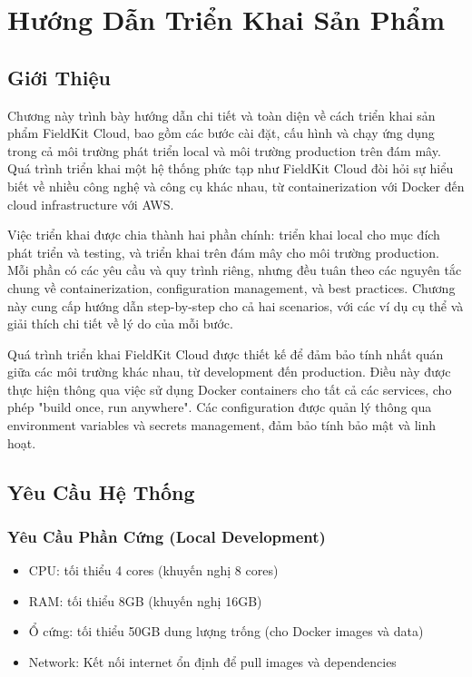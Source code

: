 \section{Hướng Dẫn Triển Khai Sản Phẩm}

\subsection{Giới Thiệu}

Chương này trình bày hướng dẫn chi tiết và toàn diện về cách triển khai sản phẩm FieldKit Cloud, bao gồm các bước cài đặt, cấu hình và chạy ứng dụng trong cả môi trường phát triển local và môi trường production trên đám mây. Quá trình triển khai một hệ thống phức tạp như FieldKit Cloud đòi hỏi sự hiểu biết về nhiều công nghệ và công cụ khác nhau, từ containerization với Docker đến cloud infrastructure với AWS.

Việc triển khai được chia thành hai phần chính: triển khai local cho mục đích phát triển và testing, và triển khai trên đám mây cho môi trường production. Mỗi phần có các yêu cầu và quy trình riêng, nhưng đều tuân theo các nguyên tắc chung về containerization, configuration management, và best practices. Chương này cung cấp hướng dẫn step-by-step cho cả hai scenarios, với các ví dụ cụ thể và giải thích chi tiết về lý do của mỗi bước.

Quá trình triển khai FieldKit Cloud được thiết kế để đảm bảo tính nhất quán giữa các môi trường khác nhau, từ development đến production. Điều này được thực hiện thông qua việc sử dụng Docker containers cho tất cả các services, cho phép "build once, run anywhere". Các configuration được quản lý thông qua environment variables và secrets management, đảm bảo tính bảo mật và linh hoạt.

\subsection{Yêu Cầu Hệ Thống}

\subsubsection{Yêu Cầu Phần Cứng (Local Development)}
\begin{itemize}
    \item CPU: tối thiểu 4 cores (khuyến nghị 8 cores)
    \item RAM: tối thiểu 8GB (khuyến nghị 16GB)
    \item Ổ cứng: tối thiểu 50GB dung lượng trống (cho Docker images và data)
    \item Network: Kết nối internet ổn định để pull images và dependencies
\end{itemize}

